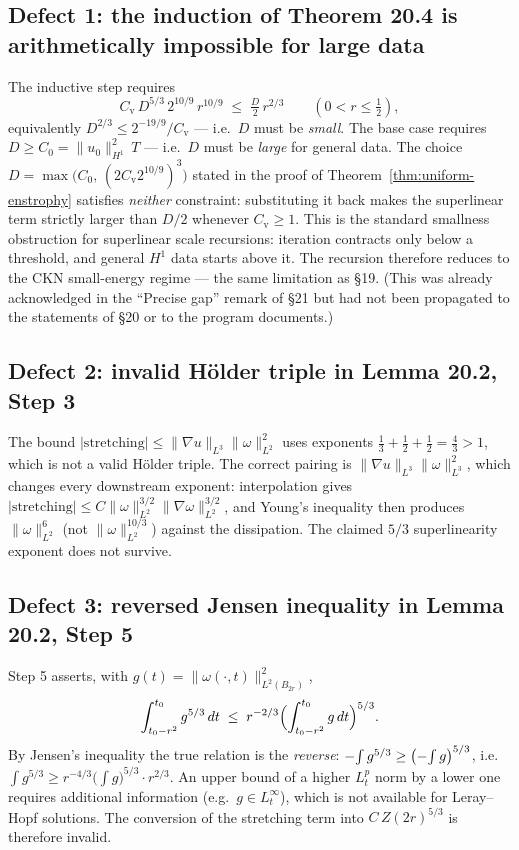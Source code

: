 \documentclass[11pt]{article}
\theoremstyle{definition}
\theoremstyle{remark}
\newcommand{\Xint}{\mathop{\mathchoice{\vcenter{\hbox{$\displaystyle-$}}}%
  {\vcenter{\hbox{$\textstyle-$}}}%
  {\vcenter{\hbox{$\scriptstyle-$}}}%
  {\vcenter{\hbox{$\scriptscriptstyle-$}}}}\!\int}
\providecommand{\fint}{\Xint}
\begin{document}
\subsection{Defect 1: the induction of Theorem 20.4 is arithmetically impossible for large data}
The inductive step requires
\[
  C_{\mathrm{v}}\,D^{5/3}\,2^{10/9}\,r^{10/9} \;\leq\; \tfrac{D}{2}\,r^{2/3}
  \qquad (0 < r \leq \tfrac12),
\]
equivalently $D^{2/3} \leq 2^{-19/9}/C_{\mathrm{v}}$ --- i.e.\ $D$ must be
\emph{small}. The base case requires $D \geq C_0 = \|u_0\|_{H^1}^2\,T$ ---
i.e.\ $D$ must be \emph{large} for general data. The choice
$D = \max\bigl(C_0,\,(2C_{\mathrm{v}}2^{10/9})^3\bigr)$ stated in the proof of
Theorem~\ref{thm:uniform-enstrophy} satisfies \emph{neither} constraint:
substituting it back makes the superlinear term strictly larger than $D/2$
whenever $C_{\mathrm{v}} \geq 1$. This is the standard smallness obstruction
for superlinear scale recursions: iteration contracts only below a threshold,
and general $H^1$ data starts above it. The recursion therefore reduces to the
CKN small-energy regime --- the same limitation as \S19. (This was already
acknowledged in the ``Precise gap'' remark of \S21 but had not been propagated
to the statements of \S20 or to the program documents.)

\subsection{Defect 2: invalid H\"older triple in Lemma 20.2, Step 3}
The bound $|\text{stretching}| \leq \|\nabla u\|_{L^3}\|\omega\|_{L^2}^2$ uses
exponents $\tfrac13 + \tfrac12 + \tfrac12 = \tfrac43 > 1$, which is not a valid
H\"older triple. The correct pairing is
$\|\nabla u\|_{L^3}\|\omega\|_{L^3}^2$, which changes every downstream
exponent: interpolation gives
$|\text{stretching}| \leq C\|\omega\|_{L^2}^{3/2}\|\nabla\omega\|_{L^2}^{3/2}$,
and Young's inequality then produces $\|\omega\|_{L^2}^6$ (not
$\|\omega\|_{L^2}^{10/3}$) against the dissipation. The claimed $5/3$
superlinearity exponent does not survive.

\subsection{Defect 3: reversed Jensen inequality in Lemma 20.2, Step 5}
Step 5 asserts, with $g(t) = \|\omega(\cdot,t)\|_{L^2(B_{2r})}^2$,
\[
  \int_{t_0-r^2}^{t_0} g^{5/3}\,dt \;\leq\; r^{-2/3}\Bigl(\int_{t_0-r^2}^{t_0} g\,dt\Bigr)^{5/3}.
\]
By Jensen's inequality the true relation is the \emph{reverse}:
$\fint g^{5/3} \geq \bigl(\fint g\bigr)^{5/3}$, i.e.\
$\int g^{5/3} \geq r^{-4/3}\bigl(\int g\bigr)^{5/3}\cdot r^{2/3}$.
An upper bound of a higher $L^p_t$ norm by a lower one requires additional
information (e.g.\ $g \in L^\infty_t$), which is not available for Leray--Hopf
solutions. The conversion of the stretching term into
$C\,Z(2r)^{5/3}$ is therefore invalid.
\end{document}

